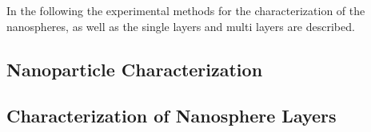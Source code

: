 \documentclass[\main/dresen_thesis.tex]{subfiles}
\renewcommand{\thisPath}{\main/chapters/looselyPackedNS/experimentalMethods/}
\begin{document}
  In the following the experimental methods for the characterization of the nanospheres, as well as the single layers and multi layers are described.

  \subsection{Nanoparticle Characterization}
  
    \FloatBarrier
    \clearpage

  \subsection{Characterization of Nanosphere Layers}
  
    \FloatBarrier
\end{document}
